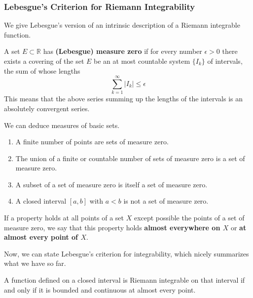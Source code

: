    \subsubsection{Lebesgue's Criterion for Riemann Integrability}
    We give Lebesgue's version of an intrinsic description of a Riemann integrable function. 

    \begin{definition}[Measure]
      A set $E \subset \mathbb{R}$ has \textbf{(Lebesgue) measure zero} if for every number $\epsilon > 0$ there exists a covering of the set $E$ be an at most countable system $\{I_k\}$ of intervals, the sum of whose lengths 
      \[\sum_{k=1}^\infty |I_k| \leq \epsilon\]
      This means that the above series summing up the lengths of the intervals is an absolutely convergent series. 
    \end{definition}

    \begin{lemma}
      We can deduce measures of basic sets. 
      \begin{enumerate}
        \item A finite number of points are sets of measure zero. 
        \item The union of a finite or countable number of sets of measure zero is a set of measure zero. \item A subset of a set of measure zero is itself a set of measure zero. 
        \item A closed interval $[a, b]$ with $a<b$ is not a set of measure zero. 
      \end{enumerate}
    \end{lemma}

    \begin{definition}
      If a property holds at all points of a set $X$ except possible the points of a set of measure zero, we say that this property holds \textbf{almost everywhere on $X$} or \textbf{at almost every point of $X$}. 
    \end{definition}

    Now, we can state Lebesgue's criterion for integrability, which nicely summarizes what we have so far. 

    \begin{theorem}
    A function defined on a closed interval is Riemann integrable on that interval if and only if it is bounded and continuous at almost every point. 
    \end{theorem}

